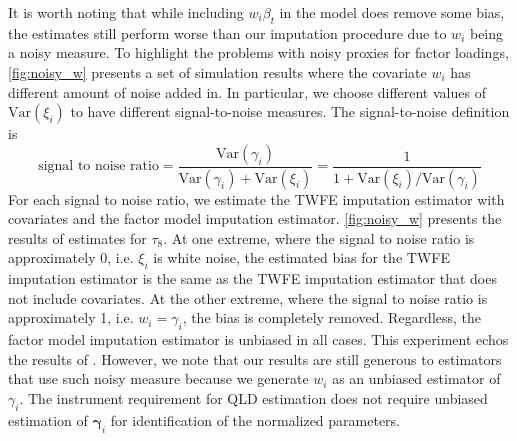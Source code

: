 \documentclass[12pt]{article}
\begin{document}
It is worth noting that while including $w_i \beta_t$ in the model does remove some bias, the estimates still perform worse than our imputation procedure due to $w_i$ being a noisy measure. To highlight the problems with noisy proxies for factor loadings, \autoref{fig:noisy_w} presents a set of simulation results where the covariate $w_i$ has different amount of noise added in. In particular, we choose different values of $\text{Var}(\xi_i)$ to have different signal-to-noise measures. The signal-to-noise definition is 
\begin{equation}
\text{signal to noise ratio} = \frac{\text{Var}(\gamma_i)}{\text{Var}(\gamma_i) + \text{Var}(\xi_i)} = \frac{1}{1 + \text{Var}(\xi_i) / \text{Var}(\gamma_i)}
\end{equation}
For each signal to noise ratio, we estimate the TWFE imputation estimator with covariates and the factor model imputation estimator. \autoref{fig:noisy_w} presents the results of estimates for $\tau_8$. At one extreme, where the signal to noise ratio is approximately 0, i.e. $\xi_i$ is white noise, the estimated bias for the TWFE imputation estimator is the same as the TWFE imputation estimator that does not include covariates. At the other extreme, where the signal to noise ratio is approximately 1, i.e. $w_i = \gamma_i$, the bias is completely removed. Regardless, the factor model imputation estimator is unbiased in all cases. This experiment echos the results of \citet{kejriwal2021efficacy}. However, we note that our results are still generous to estimators that use such noisy measure because we generate $w_i$ as an unbiased estimator of $\gamma_i$. The instrument requirement for QLD estimation does not require unbiased estimation of $\bm \gamma_i$ for identification of the normalized parameters.
\end{document}
